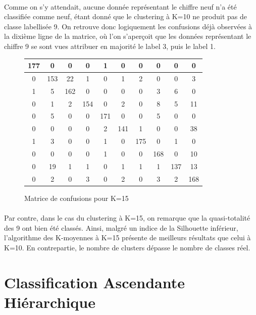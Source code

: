 \documentclass{article}
\begin{document}
\paragraph{}Comme on s'y attendait, aucune donnée représentant le chiffre neuf n'a été classifiée comme neuf, étant donné que le clustering à K=10 ne produit pas de classe labellisée 9. On retrouve donc logiquement les confusions déjà observées à la dixième ligne de la matrice, où l'on s'aperçoit que les données représentant le chiffre 9 se sont vues attribuer en majorité le label 3, puis le label 1.
\begin{figure}[H]
    \centering
    \begin{tabular}{|c|c|c|c|c|c|c|c|c|c|}
        \hline
        177 & 0 & 0 & 0 & 1 & 0 & 0 & 0 & 0 & 0 \\
        \hline
        0 & 153 & 22 & 1 & 0 & 1 & 2 & 0 & 0 & 3\\
        \hline
        1 & 5 & 162 & 0 & 0 & 0 & 0 & 3 & 6 & 0\\
        \hline
        0 & 1 & 2 & 154 & 0 & 2 & 0 & 8 & 5 & 11\\
        \hline
        0 & 5 & 0 & 0 & 171 & 0 & 0 & 5 & 0 & 0\\
        \hline
        0 & 0 & 0 & 0 & 2 & 141 & 1 & 0 & 0 & 38\\
        \hline
        1 & 3 & 0 & 0 & 1 & 0 & 175 & 0 & 1 & 0 \\
        \hline
        0 & 0 & 0 & 0 & 1 & 0 & 0 & 168 & 0 & 10 \\
        \hline
        0 & 19 & 1 & 1 & 0 & 1 & 1 & 1 & 137 & 13 \\
        \hline
        0 & 2 & 0 & 3 & 0 & 2 & 0 & 3 & 2 & 168 \\
        \hline 
    \end{tabular}
    \caption{Matrice de confusions pour K=15}    
\end{figure}
\paragraph{}Par contre, dans le cas du clustering à K=15, on remarque que la quasi-totalité des 9 ont bien été classés. Ainsi, malgré un indice de la Silhouette inférieur, l'algorithme des K-moyennes à K=15 présente de meilleurs résultats que celui à K=10. En contrepartie, le nombre de clusters dépasse le nombre de classes réel.
\section{Classification Ascendante Hiérarchique}
\end{document}
